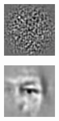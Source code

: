 \documentclass{article}
\begin{document}
\begin{figure}[h!]
\begin{subfigure}[b]{0.1\textwidth}
    \end{subfigure}
    \hspace{-1\baselineskip}
    \quad
    \begin{subfigure}[b]{0.1\textwidth}   
        \centering 
        \includegraphics[width=\textwidth]{plots/B_log_R2_template.jpg}

    \end{subfigure}
    \hspace{-1\baselineskip}
    \quad
    \begin{subfigure}[b]{0.1\textwidth}   
        \centering 
        \includegraphics[width=\textwidth]{plots/C_log_R2_template.jpg}


\end{subfigure}
\end{figure}
\end{document}
